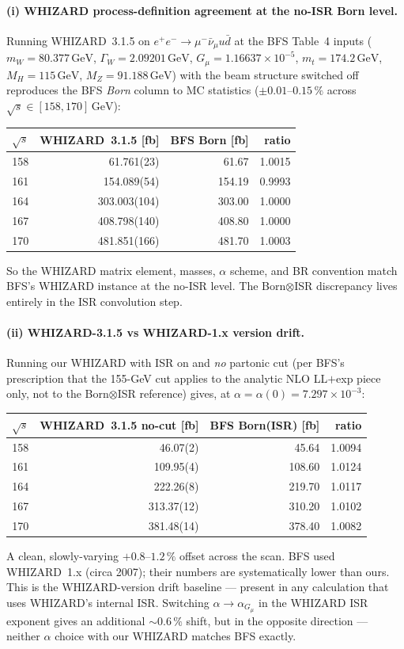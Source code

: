 \documentclass[11pt,a4paper]{article}
\newcommand{\mW}{m_W}
\newcommand{\GammaW}{\Gamma_W}
\newcommand{\sqrts}{\sqrt{s}}
\newcommand{\GeV}{\ensuremath{\,\mathrm{GeV}}}
\begin{document}
\paragraph{(i) WHIZARD process-definition agreement at the no-ISR Born level.}
Running WHIZARD~3.1.5 on
$e^+e^-\to\mu^-\bar\nu_\mu u\bar d$ at the BFS Table~4 inputs
($\mW=80.377\GeV$, $\GammaW=2.09201\GeV$, $G_\mu=1.16637\times 10^{-5}$,
$m_t=174.2\GeV$, $M_H=115\GeV$, $M_Z=91.188\GeV$) with the beam
structure switched off reproduces the BFS \emph{Born} column to MC
statistics ($\pm 0.01$--$0.15\,\%$ across $\sqrts\in[158,170]\GeV$):
\begin{center}\small
\begin{tabular}{r r r r}
\toprule
$\sqrts$ & WHIZARD~3.1.5 [fb] & BFS Born [fb] & ratio \\
\midrule
158 & 61.761(23) & 61.67 & 1.0015 \\
161 & 154.089(54) & 154.19 & 0.9993 \\
164 & 303.003(104) & 303.00 & 1.0000 \\
167 & 408.798(140) & 408.80 & 1.0000 \\
170 & 481.851(166) & 481.70 & 1.0003 \\
\bottomrule
\end{tabular}
\end{center}
So the WHIZARD matrix element, masses, $\alpha$ scheme, and BR convention
match BFS's WHIZARD instance at the no-ISR level. The
Born$\otimes$ISR discrepancy lives entirely in the ISR convolution
step.

\paragraph{(ii) WHIZARD-3.1.5 vs WHIZARD-1.x version drift.}
Running our WHIZARD with ISR on and \emph{no} partonic cut
(per BFS's prescription that the 155-GeV cut applies to the
analytic NLO LL$+$exp piece only, not to the Born$\otimes$ISR reference)
gives, at $\alpha = \alpha(0) = 7.297\!\times\!10^{-3}$:
\begin{center}\small
\begin{tabular}{r r r r}
\toprule
$\sqrts$ & WHIZARD~3.1.5 no-cut [fb] & BFS Born(ISR) [fb] & ratio \\
\midrule
158 & 46.07(2) & 45.64 & 1.0094 \\
161 & 109.95(4) & 108.60 & 1.0124 \\
164 & 222.26(8) & 219.70 & 1.0117 \\
167 & 313.37(12) & 310.20 & 1.0102 \\
170 & 381.48(14) & 378.40 & 1.0082 \\
\bottomrule
\end{tabular}
\end{center}
A clean, slowly-varying $+0.8$--$1.2\,\%$ offset across the scan. BFS
used WHIZARD~1.x (circa 2007); their numbers are systematically lower
than ours. This is the WHIZARD-version drift baseline — present in any
calculation that uses WHIZARD's internal ISR. Switching $\alpha\to\alpha_{G_\mu}$
in the WHIZARD ISR exponent gives an additional $\sim 0.6\,\%$ shift, but
in the opposite direction — neither $\alpha$ choice with our WHIZARD
matches BFS exactly.
\end{document}
